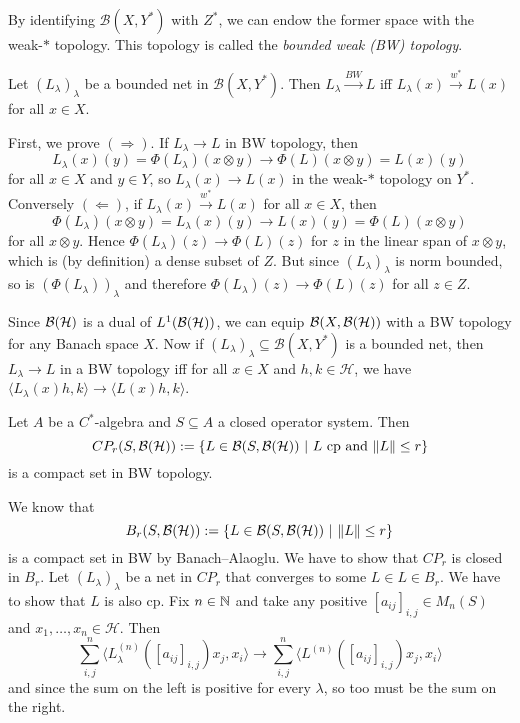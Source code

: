 By identifying $\mathcal{B} (X, Y^*)$ with $Z^*$, we can endow the former space with the weak-$*$ topology.
This topology is called the \emph{bounded weak (BW) topology}.

\begin{lemma}
    Let $(L_\lambda)_{\lambda}$ be a bounded net in $\mathcal{B}(X, Y^*)$.
    Then $L_\lambda \xrightarrow{BW} L$ iff $L_\lambda (x) \xrightarrow{w^*} L(x)$ for all $x \in X$.
\end{lemma}

\begin{myproof}
    First, we prove $(\Rightarrow)$. If $L_\lambda \to L$ in BW topology, then 
    $$L_\lambda (x) (y) = \Phi (L_\lambda) (x \otimes y) \to \Phi (L) (x \otimes y) = L(x) (y)$$
    for all $x \in X$ and $y \in Y$, so $L_\lambda (x) \to L (x)$ in the weak-$*$ topology on $Y^*$. 
    Conversely $(\Leftarrow)$, if $L_\lambda (x) \xrightarrow{w^*} L(x)$ for all $x \in X$, then
    $$\Phi (L_\lambda) (x \otimes y) = L_\lambda (x) (y) \to L(x) (y) = \Phi (L) (x \otimes y)$$
    for all $x \otimes y$. Hence $\Phi (L_\lambda)(z) \to \Phi(L) (z)$ for $z$ in the linear span of $x \otimes y$, which is (by definition)
    a dense subset of $Z$. But since $(L_\lambda)_\lambda$ is norm bounded, so is $(\Phi (L_\lambda))_\lambda$ and
    therefore $\Phi (L_\lambda) (z)\to \Phi (L) (z)$ for all $z \in Z$.
\end{myproof}

Since $\operatorname{\mathcal{B} (\mathcal{H})}$ is a dual of $L^1 (\operatorname{\mathcal{B} (\mathcal{H})})$, we can equip $\mathcal{B} (X, \operatorname{\mathcal{B} (\mathcal{H})})$ with a BW topology for any 
Banach space $X$. Now if $(L_\lambda)_\lambda \subseteq \mathcal{B} (X, Y^*)$ is a bounded net,
then $L_\lambda \to L$ in a BW topology iff for all $x \in X$ and $h, k \in \mathcal{H}$, we have 
$\langle L_\lambda (x) h, k \rangle \to \langle L(x) h, k \rangle$.

\begin{lemma}\label{lem:7.2}
    Let $A$ be a $C^*$-algebra and $S \subseteq A$ a closed operator system. Then 
    $$CP_r (S, \operatorname{\mathcal{B} (\mathcal{H})}) := \{L \in \mathcal{B} (S, \operatorname{\mathcal{B} (\mathcal{H})})\ |\ \textrm{$L$ cp and $\| L\| \leq r$}\}$$
    is a compact set in BW topology.
\end{lemma}

\begin{myproof}
    We know that 
    $$B_r (S, \operatorname{\mathcal{B} (\mathcal{H})}) := \{L \in \mathcal{B} (S, \operatorname{\mathcal{B} (\mathcal{H})})\ |\ \| L\| \leq r\}$$
    is a compact set in BW by Banach--Alaoglu. We have to show that $CP_r$ is closed in $B_r$.
    Let $(L_\lambda)_\lambda$ be a net in $CP_r$ that converges to some $L \in L \in B_r$.
    We have to show that $L$ is also cp. Fix $n \in \mathbb {N}$ and take any positive $[a_{ij}]_{i, j} \in M_n (S)$ and $x_1, \dots, x_n \in \mathcal{H}$.
    Then $$\sum_{i, j} ^n \langle L_\lambda ^{(n)} ([a_{ij}]_{i, j})x_j, x_i \rangle \to \sum_{i, j} ^n \langle L ^{(n)} ([a_{ij}]_{i, j}) x_j, x_i \rangle$$
    and since the sum on the left is positive for every $\lambda$, so too must be the sum on the right.
\end{myproof}

